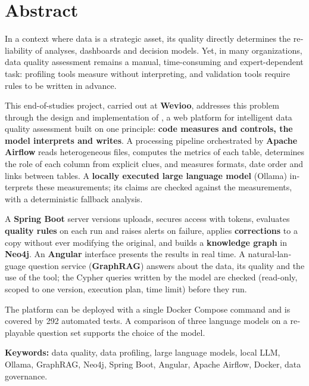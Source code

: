\chapter*{Abstract}
\begin{otherlanguage}{english}

In a context where data is a strategic asset, its quality directly determines the reliability of analyses, dashboards and decision models. Yet, in many organizations, data quality assessment remains a manual, time-consuming and expert-dependent task: profiling tools measure without interpreting, and validation tools require rules to be written in advance.

This end-of-studies project, carried out at \textbf{Wevioo}, addresses this problem through the design and implementation of \textbf{\projet}, a web platform for intelligent data quality assessment built on one principle: \textbf{code measures and controls, the model interprets and writes}. A processing pipeline orchestrated by \textbf{Apache Airflow} reads heterogeneous files, computes the metrics of each table, determines the role of each column from explicit clues, and measures formats, date order and links between tables. A \textbf{locally executed large language model} (Ollama) interprets these measurements; its claims are checked against the measurements, with a deterministic fallback analysis.

A \textbf{Spring Boot} server versions uploads, secures access with tokens, evaluates \textbf{quality rules} on each run and raises alerts on failure, applies \textbf{corrections} to a copy without ever modifying the original, and builds a \textbf{knowledge graph} in \textbf{Neo4j}. An \textbf{Angular} interface presents the results in real time. A natural-language question service (\textbf{GraphRAG}) answers about the data, its quality and the use of the tool; the Cypher queries written by the model are checked (read-only, scoped to one version, execution plan, time limit) before they run.

The platform can be deployed with a single Docker Compose command and is covered by 292 automated tests. A comparison of three language models on a replayable question set supports the choice of the model.

\vspace{0.4cm}
\noindent\textbf{Keywords:} data quality, data profiling, large language models, local LLM, Ollama, GraphRAG, Neo4j, Spring Boot, Angular, Apache Airflow, Docker, data governance.
\end{otherlanguage}
